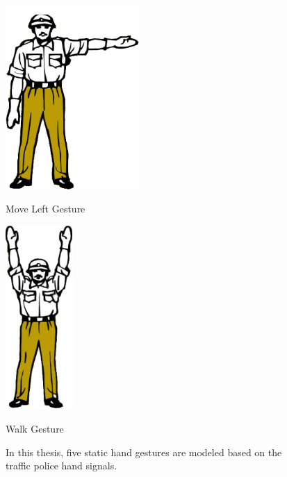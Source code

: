 \begin{figure}
\begin{minipage}
	\end{minipage}
	\begin{minipage}
		{.45 
			\textwidth} \centering 
		\includegraphics[height=7cm]{figures/content/ges-move-left.jpg} \caption{Move Left Gesture} \label{fg:ges:4} 
	\end{minipage}
	\begin{minipage}
		{.45 
		\textwidth} \centering 
		\includegraphics[height=7cm]{figures/content/ges-walk.jpg} \caption{Walk Gesture} \label{fg:ges:1} 
	\end{minipage}	

	\caption{In this thesis, five static hand gestures are modeled based on the traffic police hand signals. \cite{22} }
	\label{fg:ges:hands} 
\end{figure}

